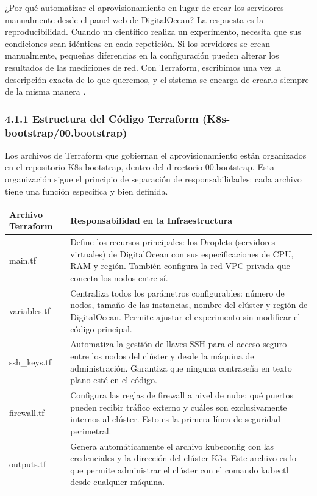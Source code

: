 \documentclass[journal]{IEEEtran}
\begin{document}
¿Por qué automatizar el aprovisionamiento en lugar de crear los servidores manualmente desde el panel web de DigitalOcean? La respuesta es la reproducibilidad. Cuando un científico realiza un experimento, necesita que sus condiciones sean idénticas en cada repetición. Si los servidores se crean manualmente, pequeñas diferencias en la configuración pueden alterar los resultados de las mediciones de red. Con Terraform, escribimos una vez la descripción exacta de lo que queremos, y el sistema se encarga de crearlo siempre de la misma manera \cite{ref7}.

\subsubsection{4.1.1 Estructura del Código Terraform (K8s-bootstrap/00.bootstrap)}

Los archivos de Terraform que gobiernan el aprovisionamiento están organizados en el repositorio K8s-bootstrap, dentro del directorio 00.bootstrap. Esta organización sigue el principio de separación de responsabilidades: cada archivo tiene una función específica y bien definida.

\begin{table}[htbp]
\centering
\scriptsize
\begin{tabularx}{\textwidth}{|Y|Y|}
\hline
\textbf{Archivo Terraform} & \textbf{Responsabilidad en la Infraestructura} \\
\hline
main.tf & Define los recursos principales: los Droplets (servidores virtuales) de DigitalOcean con sus especificaciones de CPU, RAM y región. También configura la red VPC privada que conecta los nodos entre sí. \\
variables.tf & Centraliza todos los parámetros configurables: número de nodos, tamaño de las instancias, nombre del clúster y región de DigitalOcean. Permite ajustar el experimento sin modificar el código principal. \\
ssh\_keys.tf & Automatiza la gestión de llaves SSH para el acceso seguro entre los nodos del clúster y desde la máquina de administración. Garantiza que ninguna contraseña en texto plano esté en el código. \\
firewall.tf & Configura las reglas de firewall a nivel de nube: qué puertos pueden recibir tráfico externo y cuáles son exclusivamente internos al clúster. Esto es la primera línea de seguridad perimetral. \\
outputs.tf & Genera automáticamente el archivo kubeconfig con las credenciales y la dirección del clúster K3s. Este archivo es lo que permite administrar el clúster con el comando kubectl desde cualquier máquina. \\
\hline
\end{tabularx}
\end{table}
\end{document}
